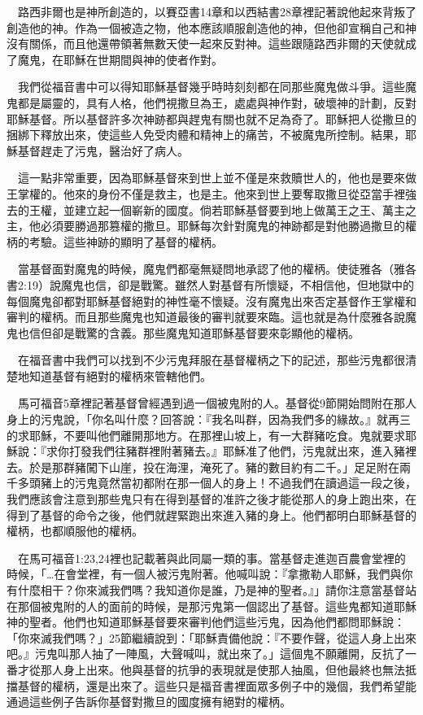 \documentclass{book}
\begin{document}
　路西非爾也是神所創造的，以賽亞書14章和以西結書28章裡記著說他起來背叛了創造他的神。作為一個被造之物，他本應該順服創造他的神，但他卻宣稱自己和神沒有關係，而且他還帶領著無數天使一起來反對神。這些跟隨路西非爾的天使就成了魔鬼，在耶穌在世期間與神的使者作對。

　我們從福音書中可以得知耶穌基督幾乎時時刻刻都在同那些魔鬼做斗爭。這些魔鬼都是屬靈的，具有人格，他們視撒旦為王，處處與神作對，破壞神的計劃，反對耶穌基督。所以基督許多次神跡都與趕鬼有關也就不足為奇了。耶穌把人從撒旦的捆綁下釋放出來，使這些人免受肉體和精神上的痛苦，不被魔鬼所控制。結果，耶穌基督趕走了污鬼，醫治好了病人。

　這一點非常重要，因為耶穌基督來到世上並不僅是來救贖世人的，他也是要來做王掌權的。他來的身份不僅是救主，也是主。他來到世上要奪取撒旦從亞當手裡強去的王權，並建立起一個嶄新的國度。倘若耶穌基督要到地上做萬王之王、萬主之主，他必須要勝過那篡權的撒旦。耶穌每次針對魔鬼的神跡都是對他勝過撒旦的權柄的考驗。這些神跡的顯明了基督的權柄。

　當基督面對魔鬼的時候，魔鬼們都毫無疑問地承認了他的權柄。使徒雅各（雅各書2:19）說魔鬼也信，卻是戰驚。雖然人對基督有所懷疑，不相信他，但地獄中的每個魔鬼卻都對耶穌基督絕對的神性毫不懷疑。沒有魔鬼出來否定基督作王掌權和審判的權柄。而且那些魔鬼也知道最後的審判就要來臨。這也就是為什麼雅各說魔鬼也信但卻是戰驚的含義。那些魔鬼知道耶穌基督要來彰顯他的權柄。

　在福音書中我們可以找到不少污鬼拜服在基督權柄之下的記述，那些污鬼都很清楚地知道基督有絕對的權柄來管轄他們。

　馬可福音5章裡記著基督曾經遇到過一個被鬼附的人。基督從9節開始問附在那人身上的污鬼說，「你名叫什麼？回答說：『我名叫群，因為我們多的緣故。』就再三的求耶穌，不要叫他們離開那地方。在那裡山坡上，有一大群豬吃食。鬼就要求耶穌說：『求你打發我們往豬群裡附著豬去。』耶穌准了他們，污鬼就出來，進入豬裡去。於是那群豬闖下山崖，投在海浬，淹死了。豬的數目約有二千。」足足附在兩千多頭豬上的污鬼竟然當初都附在那一個人的身上！不過我們在讀過這一段之後，我們應該會注意到那些鬼只有在得到基督的准許之後才能從那人的身上跑出來，在得到了基督的命令之後，他們就趕緊跑出來進入豬的身上。他們都明白耶穌基督的權柄，也都順服他的權柄。

　在馬可福音1:23,24裡也記載著與此同屬一類的事。當基督走進迦百農會堂裡的時候，「…在會堂裡，有一個人被污鬼附著。他喊叫說：『拿撒勒人耶穌，我們與你有什麼相干？你來滅我們嗎？我知道你是誰，乃是神的聖者。』」請你注意當基督站在那個被鬼附的人的面前的時候，是那污鬼第一個認出了基督。這些鬼都知道耶穌神的聖者。他們也知道耶穌基督要來審判他們這些污鬼，因為他們都問耶穌說：「你來滅我們嗎？」25節繼續說到：「耶穌責備他說：『不要作聲，從這人身上出來吧。』污鬼叫那人抽了一陣風，大聲喊叫，就出來了。」這個鬼不願離開，反抗了一番才從那人身上出來。他與基督的抗爭的表現就是使那人抽風，但他最終也無法抵擋基督的權柄，還是出來了。這些只是福音書裡面眾多例子中的幾個，我們希望能通過這些例子告訴你基督對撒旦的國度擁有絕對的權柄。
\end{document}
